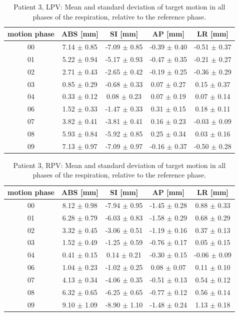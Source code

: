 \documentclass[type=dr, dr=rernat, accentcolor=tud7b,colorbacktitle, bigchapter, openright, twoside, 12pt ]{tudthesis}
\begin{document}

\begin{table}[H]
  \centering
  \caption{Patient 3, LPV: Mean and standard deviation of target motion in all phases of the respiration, relative to the reference phase.}
  \begin{tabular}{|c|c|c|c|c|}
    \hline\hline
    motion phase & ABS [mm] & SI [mm] & AP [mm] & LR [mm]\\
    \hline 
00& 7.14 $\pm$ 0.85& -7.09 $\pm$ 0.85& -0.39 $\pm$ 0.40& -0.51 $\pm$ 0.37 \\
01& 5.22 $\pm$ 0.94& -5.17 $\pm$ 0.93& -0.47 $\pm$ 0.35& -0.21 $\pm$ 0.27 \\
02& 2.71 $\pm$ 0.43& -2.65 $\pm$ 0.42& -0.19 $\pm$ 0.25& -0.36 $\pm$ 0.29 \\
03& 0.85 $\pm$ 0.29& -0.68 $\pm$ 0.33& 0.07 $\pm$ 0.27& 0.15 $\pm$ 0.37 \\
04& 0.33 $\pm$ 0.12& 0.08 $\pm$ 0.23& 0.07 $\pm$ 0.19& 0.07 $\pm$ 0.14 \\
06& 1.52 $\pm$ 0.33& -1.47 $\pm$ 0.33& 0.31 $\pm$ 0.15& 0.18 $\pm$ 0.11 \\
07& 3.82 $\pm$ 0.41& -3.81 $\pm$ 0.41& 0.16 $\pm$ 0.23& -0.03 $\pm$ 0.09 \\
08& 5.93 $\pm$ 0.84& -5.92 $\pm$ 0.85& 0.25 $\pm$ 0.34& 0.03 $\pm$ 0.16 \\
09& 7.13 $\pm$ 0.97& -7.09 $\pm$ 0.97& -0.16 $\pm$ 0.37& -0.50 $\pm$ 0.28 \\
        \hline\hline
  \end{tabular}
\end{table}

\begin{table}[H]
  \centering
  \caption{Patient 3, RPV: Mean and standard deviation of target motion in all phases of the respiration, relative to the reference phase.}
  \begin{tabular}{|c|c|c|c|c|}
    \hline\hline
    motion phase & ABS [mm] & SI [mm] & AP [mm] & LR [mm]\\
    \hline 
00& 8.12 $\pm$ 0.98& -7.94 $\pm$ 0.95& -1.45 $\pm$ 0.28& 0.88 $\pm$ 0.33 \\
01& 6.28 $\pm$ 0.79& -6.03 $\pm$ 0.83& -1.58 $\pm$ 0.29& 0.68 $\pm$ 0.29 \\
02& 3.32 $\pm$ 0.45& -3.06 $\pm$ 0.51& -1.19 $\pm$ 0.16& 0.37 $\pm$ 0.13 \\
03& 1.52 $\pm$ 0.49& -1.25 $\pm$ 0.59& -0.76 $\pm$ 0.17& 0.05 $\pm$ 0.15 \\
04& 0.41 $\pm$ 0.15& 0.14 $\pm$ 0.21& -0.30 $\pm$ 0.15& -0.06 $\pm$ 0.09 \\
06& 1.04 $\pm$ 0.23& -1.02 $\pm$ 0.25& 0.08 $\pm$ 0.07& 0.11 $\pm$ 0.10 \\
07& 4.13 $\pm$ 0.34& -4.06 $\pm$ 0.35& -0.51 $\pm$ 0.13& 0.54 $\pm$ 0.12 \\
08& 6.32 $\pm$ 0.65& -6.25 $\pm$ 0.65& -0.77 $\pm$ 0.12& 0.56 $\pm$ 0.14 \\
09& 9.10 $\pm$ 1.09& -8.90 $\pm$ 1.10& -1.48 $\pm$ 0.24& 1.13 $\pm$ 0.18 \\
        \hline\hline
  \end{tabular}
\end{table}
\end{document}
